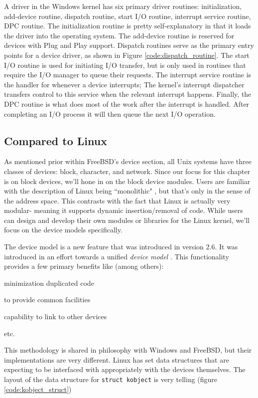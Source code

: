 \documentclass[10pt,draftclsnofoot,onecolumn]{IEEEtran}
\begin{document}
\par A driver in the Windows kernel has six primary driver routines: initialization, add-device routine, dispatch routine, start I/O routine, interrupt service routine, DPC routine.
The initialization routine is pretty self-explanatory in that it loads the driver into the operating system.
The add-device routine is reserved for devices with Plug and Play support.
Dispatch routines serve as the primary entry points for a device driver, as shown in Figure \ref{code:dispatch_routine}.
The start I/O routine is used for initiating I/O transfer, but is only used in routines that require the I/O manager to queue their requests.
The interrupt service routine is the handler for whenever a device interrupts; The kernel's interrupt dispatcher transfers control to this service when the relevant interrupt happens.
Finally, the DPC routine is what does most of the work after the interrupt is handled.
After completing an I/O process it will then queue the next I/O operation.

\subsection{Compared to Linux}
\label{sub:Devices Linux}
\par As mentioned prior within FreeBSD's device section, all Unix systems have three classes of devices: block, character, and network.
Since our focus for this chapter is on block devices, we'll hone in on the block device modules.
Users are familiar with the description of Linux being ``monolithic" \cite{linux:1}, but that's only in the sense of the address space.
This contrasts with the fact that Linux is actually very modular- meaning it supports dynamic insertion/removal of code.
While users can design and develop their own modules or libraries for the Linux kernel, we'll focus on the device models specifically.

\par The device model is a new feature that was introduced in version 2.6.
It was introduced in an effort towards a unified \textit{device model} \cite{linux:1}.
This functionality provides a few primary benefits like (among others):
\begin{list}{-}{}
\item minimization duplicated code
\item to provide common facilities
\item capability to link to other devices
\item etc.
\end{list}
This methodology is shared in philosophy with Windows and FreeBSD, but their implementations are very different.
Linux has set data structures that are expecting to be interfaced with appropriately with the devices themselves.
The layout of the data structure for \texttt{struct kobject} is very telling (figure \ref{code:kobject_struct})
\end{document}

